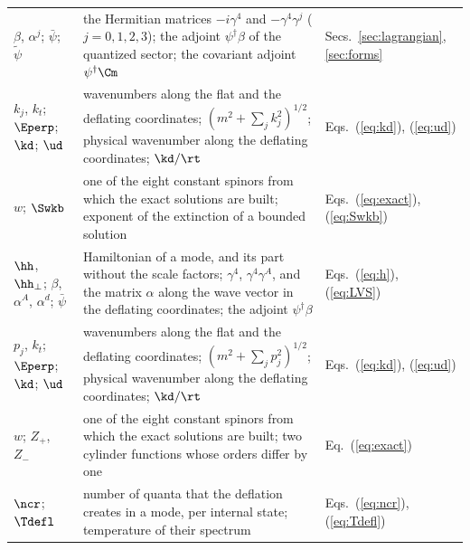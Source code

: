 \begin{table}
\begin{ruledtabular}
\begin{tabular}{p{}p{}p{}}
$\beta$, $\alpha^{j}$; $\bar\psi$; $\tilde\psi$ & the Hermitian matrices $-i\gamma^{4}$ and $-\gamma^{4}\gamma^{j}$ ($j=0,1,2,3$); the adjoint $\psi^\dagger\beta$ of the quantized sector; the covariant adjoint $\psi^\dagger\Cm$ & Secs.~\ref{sec:lagrangian}, \ref{sec:forms} \\
$k_j$, $k_t$; $\Eperp$; $\kd$; $\ud$ & wavenumbers along the flat and the deflating coordinates; $(m^{2}+\sum_jk_j^{2})^{1/2}$; physical wavenumber along the deflating coordinates; $\kd/\rt$ & Eqs.~(\ref{eq:kd}), (\ref{eq:ud}) \\
$w$; $\Swkb$ & one of the eight constant spinors from which the exact solutions are built; exponent of the extinction of a bounded solution & Eqs.~(\ref{eq:exact}), (\ref{eq:Swkb}) \\
$\hh$, $\hh_\perp$; $\beta$, $\alpha^{A}$, $\alpha^{d}$; $\bar\psi$ & Hamiltonian of a mode, and its part without the scale factors; $\gamma^{4}$, $\gamma^{4}\gamma^{A}$, and the matrix $\alpha$ along the wave vector in the deflating coordinates; the adjoint $\psi^\dagger\beta$ & Eqs.~(\ref{eq:h}), (\ref{eq:LVS}) \\
$p_j$, $k_t$; $\Eperp$; $\kd$; $\ud$ & wavenumbers along the flat and the deflating coordinates; $(m^{2}+\sum_jp_j^{2})^{1/2}$; physical wavenumber along the deflating coordinates; $\kd/\rt$ & Eqs.~(\ref{eq:kd}), (\ref{eq:ud}) \\
$w$; $Z_+$, $Z_-$ & one of the eight constant spinors from which the exact solutions are built; two cylinder functions whose orders differ by one & Eq.~(\ref{eq:exact}) \\
$\ncr$; $\Tdefl$ & number of quanta that the deflation creates in a mode, per internal state; temperature of their spectrum & Eqs.~(\ref{eq:ncr}), (\ref{eq:Tdefl}) \\
\end{tabular}
\end{ruledtabular}
\end{table}

